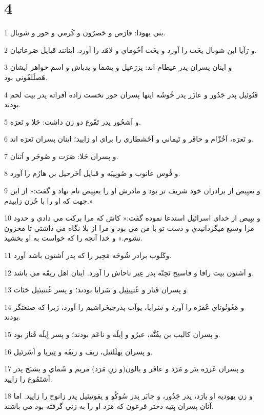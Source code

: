 \chapter{4}

\par 1 بني يهودا: فارَص و حَصرُون و کَرمي و حور و شوبال.
\par 2 و رَآيا ابن شوبال يحَت را آورد و يحَت اَخُوماي و لاهَد را آورد. اينانند قبايل صَرعاتيان.
\par 3 و اينان پسران پدر عيطام اند: يزرَعيل و يشما و يدباش و اسم خواهر ايشان هَصلَلفُوني بود.
\par 4 فَنُوئيل پدر جَدُور و عازَر پدر خُوشَه اينها پسران حور نخست زاده اَفراته پدر بيت لحم بودند.
\par 5 و اَشحُور پدر تَقّوع دو زن داشت: حَلا و نَعرَه.
\par 6 و نَعرَه، اَخُزّام و حافَر و تَيماني و اَخَشطاري را براي او زاييد؛ اينان پسران نَعرَه اند.
\par 7 و پسران حَلا: صَرَت و صُوحَر و اَتنان.
\par 8 و قُوس عانوب و صُوبِيبَه و قبايل اَخَرحيل بن هارُم را آورد.
\par 9 و يعبِيص از برادران خود شريف تر بود و مادرش او را يعبِيص نام نهاد و گفت:« از اين جهت که او را با حُزن زاييدم.»
\par 10 و يبِيص از خداي اسرائيل استدعا نموده گفت:« کاش که مرا برکت مي دادي و حدود مرا وسيع ميگردانيدي و دست تو با من مي بود و مرا از بلا نگاه مي داشتي تا محزون نشوم.» و خدا آنچه را که خواست به او بخشيد.
\par 11 وکَلوب برادر شُوحَه مَحِير را که پدر اَشتون باشد آورد.
\par 12 و اَشتون بيت رافا و فاسيح تَحِنّه پدر عِير ناحاش را آورد. اينان اهل ريقَه مي باشد.
\par 13 و پسران قَناز و عُتنِيئِيل و سَرايا بودند؛ و پسر عُتنيئيل حَتَات.
\par 14 و مَعُونُوتاي عُفرَه را آورد و سَرايا، يوآب پدرجيحَراشيم را آورد، زيرا که صنعتگر بودند.
\par 15 و پسران کاليب بن يفُنَّه، عيرُو و اِيلَه و ناعَم بودند؛ و پسر اِيلَه قَناز بود.
\par 16 و پسران يهلَلئيل، زيف و زيفَه و تِيريا و اَسَرئيل.
\par 17 و پسران عَزرَه يتَر و مَرَد و عافَر و يالون(و زنِ مَرَد) مريم و شَماي و يشبَح پدر اَشتَمُوع را زاييد.
\par 18 و زن يهوديه او يارَد، پدر جَدُور، و جابَر پدر سُوکُو و يقوتيئيل پدر زانوح را زاييد. اما آنان پسران بِتيه دختر فرعون که مَرَد او را به زني گرفته بود مي باشند.
